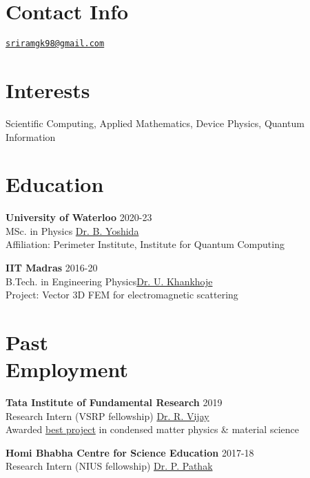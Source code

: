 \documentclass[margin,line]{res}
\begin{document}

\begin{resume}
\section{\sc Contact Info}
\href{mailto:sgopalakrishnan@pitp.ca}{\texttt{sriramgk98@gmail.com}}

\section{\sc Interests}
Scientific Computing, Applied Mathematics, Device Physics, Quantum Information

\section{\sc Education}
{\bf University of Waterloo} \hfill 2020-23\\
MSc. in Physics \hfill  \href{https://perimeterinstitute.ca/people/beni-yoshida}{\sffamily Dr. B. Yoshida}\\
Affiliation: Perimeter Institute, Institute for Quantum Computing

{\bf IIT Madras} \hfill 2016-20 \\
B.Tech. in Engineering Physics\hfill  \href{http://www.ee.iitm.ac.in/uday/index.html}{\sffamily Dr. U. Khankhoje}\\
Project: Vector 3D FEM for electromagnetic scattering

\section{\sc Past\\Employment}
{\bf Tata Institute of Fundamental Research} \hfill 2019\\
Research Intern (VSRP fellowship) \hfill \href{https://www.tifr.res.in/~quantro/people.html}{\sffamily Dr. R. Vijay}\\
Awarded \href{https://sriramgkn.github.io/docs/vsrp_awardcertificate.pdf}{\sffamily best project} in condensed matter physics \& material science

{\bf Homi Bhabha Centre for Science Education} \hfill 2017-18\\
Research Intern (NIUS fellowship) \hfill \href{https://www.hbcse.tifr.res.in/people/scientific/praveen-p-pathak}{\sffamily Dr. P. Pathak}


\end{resume}
\end{document}
